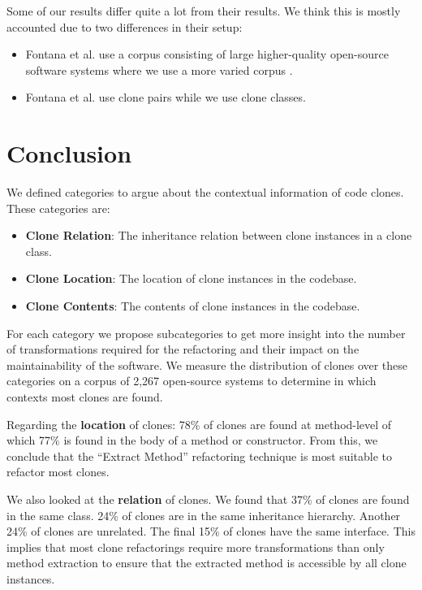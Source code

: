 \documentclass[runningheads]{llncs}
\begin{document}
Some of our results differ quite a lot from their results. We think this is mostly accounted due to two differences in their setup:
\begin{itemize}
\item Fontana et al. use a corpus consisting of large higher-quality open-source software systems \cite{tempero2010qualitas} where we use a more varied corpus \cite{githubCorpus2013}.
\item Fontana et al. use clone pairs while we use clone classes.
\end{itemize}

\section{Conclusion}
We defined categories to argue about the contextual information of code clones. These categories are:
\begin{itemize}
  \item \textbf{Clone Relation}: The inheritance relation between clone instances in a clone class.
  \item \textbf{Clone Location}: The location of clone instances in the codebase.
  \item \textbf{Clone Contents}: The contents of clone instances in the codebase.
\end{itemize}
For each category we propose subcategories to get more insight into the number of transformations required for the refactoring and their impact on the maintainability of the software. We measure the distribution of clones over these categories on a corpus of 2,267 open-source systems to determine in which contexts most clones are found.

Regarding the \textbf{location} of clones: 78\% of clones are found at method-level of which 77\% is found in the body of a method or constructor. From this, we conclude that the ``Extract Method'' refactoring technique is most suitable to refactor most clones.

We also looked at the \textbf{relation} of clones. We found that 37\% of clones are found in the same class. 24\% of clones are in the same inheritance hierarchy. Another 24\% of clones are unrelated. The final 15\% of clones have the same interface. This implies that most clone refactorings require more transformations than only method extraction to ensure that the extracted method is accessible by all clone instances.

\printbibliography
\end{document}

